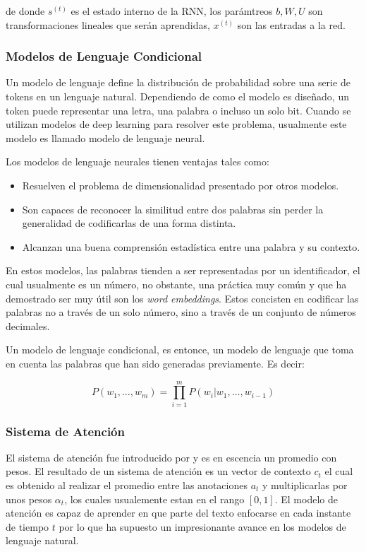 	de donde $s^{(t)}$ es el estado interno de la RNN, los parámtreos $b, W, U$ son transformaciones lineales que serán aprendidas, $x^{(t)}$ son las entradas a la red.

	\subsubsection{Modelos de Lenguaje Condicional}

	Un modelo de lenguaje define la distribución de probabilidad sobre una serie de tokens en un lenguaje natural. Dependiendo de como el modelo es diseñado, un token puede representar una letra, una palabra o incluso un solo bit. Cuando se utilizan modelos de deep learning para resolver este problema, usualmente este modelo es llamado modelo de lenguaje neural.

	Los modelos de lenguaje neurales tienen ventajas tales como:
	\begin{itemize}
		\item Resuelven el problema de dimensionalidad presentado por otros modelos.
		\item Son capaces de reconocer la similitud entre dos palabras sin perder la generalidad de codificarlas de una forma distinta.
		\item Alcanzan una buena comprensión estadística entre una palabra y su contexto.
	\end{itemize}

	En estos modelos, las palabras tienden a ser representadas por un identificador, el cual usualmente es un número, no obstante, una práctica muy común y que ha demostrado ser muy útil son los \textit{word embeddings}. Estos concisten en codificar las palabras no a través de un solo número, sino a través de un conjunto de números decimales.

	Un modelo de lenguaje condicional, es entonce, un modelo de lenguaje que toma en cuenta las palabras que han sido generadas previamente. Es decir:

	\begin{equation}
		P(w_{1}, \dots, w_{m}) = \prod_{i = 1}^{m} P(w_{i}|w_{1}, \dots, w_{i-1})
	\end{equation}

	\subsubsection{Sistema de Atención}

	El sistema de atención fue introducido por \cite{bahdanau2014neural} y es en escencia un promedio con pesos. El resultado de un sistema de atención es un vector de contexto $c_{t}$ el cual es obtenido al realizar el promedio entre las anotaciones $a_{t}$ y multiplicarlas por unos pesos $\alpha_{t}$, los cuales usualemente estan en el rango $[0,1]$. El modelo de atención es capaz de aprender en que parte del texto enfocarse en cada instante de tiempo $t$ por lo que ha supuesto un impresionante avance en los modelos de lenguaje natural.

